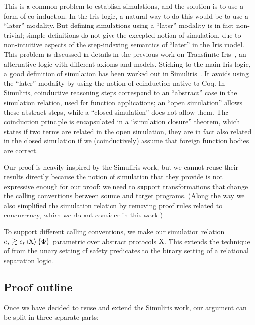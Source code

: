 This is a common problem to establish simulations, and the solution is to use a form of co-induction.
%
In the Iris logic, a natural way to do this would be to use a ``later'' modality.
%
But defining simulations using a ``later'' modality is in fact non-trivial; simple definitions do not give the excepted notion of simulation, due to non-intuitive aspects of the step-indexing semantics of ``later'' in the Iris model. This problem is discussed in details in the previous work on Transfinite Iris~\citep*{TODO-transfinite-Iris}, an alternative logic with different axioms and models.
%
Sticking to the main Iris logic, a good definition of simulation has been worked out in Simuliris~\citep*{TODO-Simuliris}.
%
It avoids using the ``later'' modality by using the notion of coinduction native to Coq. In Simuliris, coinductive reasoning steps correspond to an ``abstract'' case in the simulation relation, used for function applications; an ``open simulation'' allows these abstract steps, while a ``closed simulation'' does not allow them.
%
The coinduction principle is encapsulated in a ``simulation closure'' theorem, which states if two terms are related in the open simulation, they are in fact also related in the closed simulation if we (coinductively) assume that foreign function bodies are correct.

Our proof is heavily inspired by the Simuliris work, but we cannot reuse their results directly because the notion of simulation that they provide is not expressive enough for our proof: we need to support transformations that change the calling conventions between source and target programs.
%
(Along the way we also simplified the simulation relation by removing proof rules related to concurrency, which we do not consider in this work.)

To support different calling conventions, we make our simulation relation $\iSim[\iProt]{\iPred}{\datalangExpr_s}{\datalangExpr_t}$ parametric over abstract protocols $\mathrm{X}$. This extends the technique of \citet*{TODO-paulo} from the unary setting of safety predicates to the binary setting of a relational separation logic.

\subsection{Proof outline}

Once we have decided to reuse and extend the Simuliris work, our argument can be split in three separate parts:

